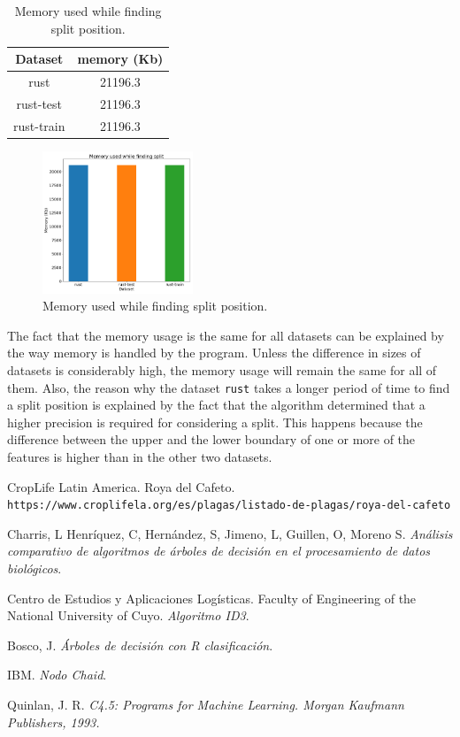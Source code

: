 \documentclass{acm_proc_article-sp}
\begin{document}
\begin {itemize}
  \begin{table}[h]
    \centering
    \begin{tabular}{|c|c|}
      \hline
      Dataset & memory (Kb) \\ \hline
      rust       & 21196.3 \\
      rust-test  & 21196.3 \\
      rust-train & 21196.3 \\ \hline
    \end{tabular}
    \caption{Memory used while finding split position.}
    \label{table:7}
  \end{table}
  \begin{figure}[h]
    \centering
    \includegraphics[width=0.4\textwidth]{splitmemory}
    \caption{Memory used while finding split position.}
    \label{fig:splitmemory}
  \end{figure}
\end{itemize}
The fact that the memory usage is the same for all datasets can be explained by the way memory is handled by the program. Unless the difference in sizes of datasets is considerably high, the memory usage will remain the same for all of them.
Also, the reason why the dataset \texttt{rust} takes a longer period of time to find a split position is explained by the fact that the algorithm determined that a higher precision is required for considering a split. This happens because the difference between the upper and the lower boundary of one or more of the features is higher than in the other two datasets. 

\begin{thebibliography}{9}

CropLife Latin America. Roya del Cafeto.
\\\texttt{https://www.croplifela.org/es/plagas/listado-de-plagas/roya-del-cafeto}

Charris, L Henríquez, C, Hernández, S, Jimeno, L, Guillen, O, Moreno S.
\textit{Análisis comparativo de algoritmos de árboles de decisión en el procesamiento de datos biológicos}.

Centro de Estudios y Aplicaciones Logísticas. Faculty of Engineering of the National University of Cuyo.
\textit{Algoritmo ID3}.

Bosco, J.
\textit{Árboles de decisión con R clasificación}.

IBM.
\textit{Nodo Chaid}.

Quinlan, J. R.
\textit{C4.5: Programs for Machine Learning. Morgan Kaufmann Publishers, 1993.}

\end{thebibliography}

\balancecolumns
\end{document}
